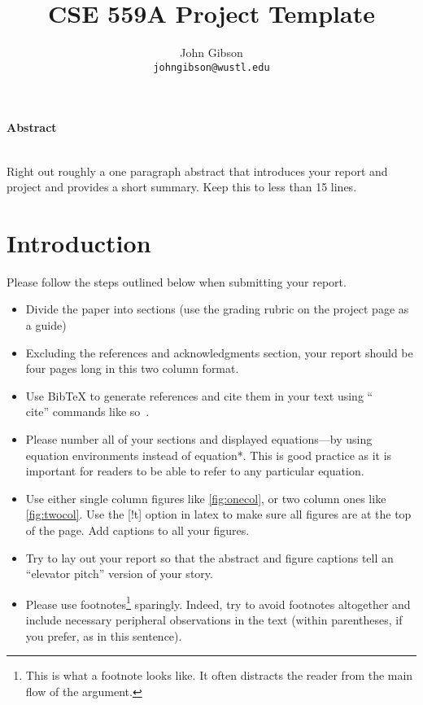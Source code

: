 \documentclass[10pt,twocolumn,letterpaper]{article}
\date{}
\title{CSE 559A Project Template}
\author{%
John Gibson\\
{\tt johngibson@wustl.edu}
}
\begin{document}
\maketitle

\begin{center}\textbf{Abstract}\\~\\\parbox{0.475\textwidth}{\em
    
    Right out roughly a one paragraph abstract that introduces your
    report and project and provides a short summary. Keep this to less
    than 15 lines.

}\end{center}

\section{Introduction}

Please follow the steps outlined below when submitting your report.

\begin{itemize}
\item Divide the paper into sections (use the grading rubric on the
  project page as a guide)
  
\item Excluding the references and acknowledgments section, your
  report should be four pages long in this two column format.

\item Use BibTeX to generate references and cite them in your text
  using ``\\cite'' commands like so~\cite{szeliski2010computer}.

\item Please number all of your sections and displayed equations---by
  using equation environments instead of equation*.  This is good
  practice as it is important for readers to be able to refer to any
  particular equation.

\item Use either single column figures like \ref{fig:onecol}, or two
  column ones like \ref{fig:twocol}. Use the [!t] option in latex to
  make sure all figures are at the top of the page. Add captions to
  all your figures.

\item Try to lay out your report so that the abstract and figure
  captions tell an ``elevator pitch'' version of your story.

\item Please use footnotes\footnote {This is what a footnote looks
    like.  It often distracts the reader from the main flow of the
    argument.} sparingly.  Indeed, try to avoid footnotes altogether
  and include necessary peripheral observations in the text (within
  parentheses, if you prefer, as in this sentence).
\end{itemize}
\end{document}
